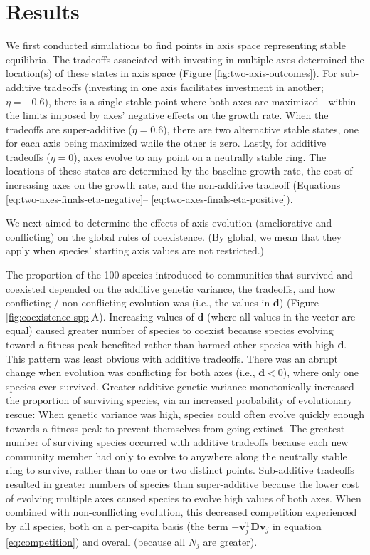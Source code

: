 \section*{Results}


We first conducted simulations to find points in axis space 
representing stable equilibria.
The tradeoffs associated with investing in multiple axes
determined the location(s) of these states in axis space
(Figure \ref{fig:two-axis-outcomes}).
For sub-additive tradeoffs 
(investing in one axis facilitates investment in another; $\eta = -0.6$), 
there is a single stable point where both axes are
maximized---within the limits imposed by axes' negative effects on 
the growth rate.
When the tradeoffs are super-additive ($\eta = 0.6$), there are two
alternative stable states, one for each axis being maximized while the 
other is zero.
Lastly, for additive tradeoffs ($\eta = 0$), axes
evolve to any point on a neutrally stable ring.
The locations of these states are determined by 
the baseline growth rate, 
the cost of increasing axes on the growth rate,
and the non-additive tradeoff
(Equations \ref{eq:two-axes-finals-eta-negative}--%
\ref{eq:two-axes-finals-eta-positive}).


We next aimed to determine the effects of axis evolution (ameliorative and
conflicting) on the global rules of coexistence.
(By global, we mean that they apply when species' starting axis values are not
restricted.)



The proportion of the 100 species introduced to communities that survived and
coexisted depended on the additive genetic variance, 
the tradeoffs, and
how conflicting / non-conflicting evolution was (i.e., the values in $\mathbf{d}$)
(Figure \ref{fig:coexistence-spp}A).
Increasing values of $\mathbf{d}$ (where all values in the vector are equal)
caused greater number of species to coexist
because species evolving toward a fitness peak benefited rather than 
harmed other species with high $\mathbf{d}$.
This pattern was least obvious with additive tradeoffs.
There was an abrupt change when evolution was conflicting for both axes 
(i.e., $\mathbf{d} < 0$), where only one species ever survived.
Greater additive genetic variance monotonically increased the proportion of 
surviving species, via an increased probability 
of evolutionary rescue: When genetic variance was high, 
species could often evolve quickly enough towards a 
fitness peak to prevent themselves from going extinct.
The greatest number of surviving species occurred with additive tradeoffs
because each new community member had only to evolve to anywhere along the
neutrally stable ring to survive, rather than to one or two distinct points.
Sub-additive tradeoffs resulted in greater numbers of species than super-additive
because the lower cost of evolving multiple axes caused species to evolve
high values of both axes.
When combined with non-conflicting evolution,
this decreased competition experienced by all species, both on a 
per-capita basis (the term $- \mathbf{v}_{j}^{\text{T}} \mathbf{D} \mathbf{v}_j$ 
in equation \ref{eq:competition})
and overall (because all $N_j$ are greater).



